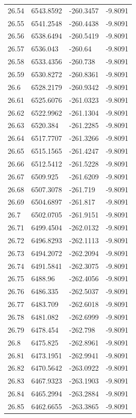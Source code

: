 \begin{table}[H]
\begin{tabular}{llll}
26.54 & 6543.8592 & -260.3457 & -9.8091 \\
26.55 & 6541.2548 & -260.4438 & -9.8091 \\
26.56 & 6538.6494 & -260.5419 & -9.8091 \\
26.57 & 6536.043 & -260.64 & -9.8091 \\
26.58 & 6533.4356 & -260.738 & -9.8091 \\
26.59 & 6530.8272 & -260.8361 & -9.8091 \\
26.6 & 6528.2179 & -260.9342 & -9.8091 \\
26.61 & 6525.6076 & -261.0323 & -9.8091 \\
26.62 & 6522.9962 & -261.1304 & -9.8091 \\
26.63 & 6520.384 & -261.2285 & -9.8091 \\
26.64 & 6517.7707 & -261.3266 & -9.8091 \\
26.65 & 6515.1565 & -261.4247 & -9.8091 \\
26.66 & 6512.5412 & -261.5228 & -9.8091 \\
26.67 & 6509.925 & -261.6209 & -9.8091 \\
26.68 & 6507.3078 & -261.719 & -9.8091 \\
26.69 & 6504.6897 & -261.817 & -9.8091 \\
26.7 & 6502.0705 & -261.9151 & -9.8091 \\
26.71 & 6499.4504 & -262.0132 & -9.8091 \\
26.72 & 6496.8293 & -262.1113 & -9.8091 \\
26.73 & 6494.2072 & -262.2094 & -9.8091 \\
26.74 & 6491.5841 & -262.3075 & -9.8091 \\
26.75 & 6488.96 & -262.4056 & -9.8091 \\
26.76 & 6486.335 & -262.5037 & -9.8091 \\
26.77 & 6483.709 & -262.6018 & -9.8091 \\
26.78 & 6481.082 & -262.6999 & -9.8091 \\
26.79 & 6478.454 & -262.798 & -9.8091 \\
26.8 & 6475.825 & -262.8961 & -9.8091 \\
26.81 & 6473.1951 & -262.9941 & -9.8091 \\
26.82 & 6470.5642 & -263.0922 & -9.8091 \\
26.83 & 6467.9323 & -263.1903 & -9.8091 \\
26.84 & 6465.2994 & -263.2884 & -9.8091 \\
26.85 & 6462.6655 & -263.3865 & -9.8091 \\

\end{tabular}
\end{table}
